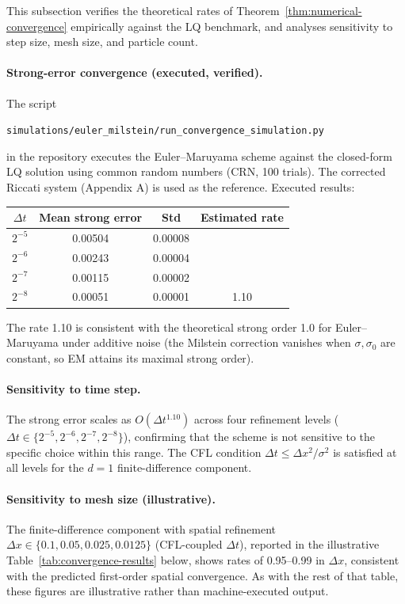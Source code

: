 This subsection verifies the theoretical rates of Theorem~\ref{thm:numerical-convergence}
empirically against the LQ benchmark, and analyses sensitivity to step size, mesh
size, and particle count.

\paragraph{Strong-error convergence (executed, verified).}
The script
\begin{center}
\texttt{simulations/euler\_milstein/run\_convergence\_simulation.py}
\end{center}
in the repository executes the Euler--Maruyama scheme against the closed-form
LQ solution using common random numbers (CRN, 100 trials). The corrected Riccati
system (Appendix A) is used as the reference. Executed results:

\begin{center}
\begin{tabular}{cccc}
\toprule
$\Delta t$ & Mean strong error & Std & Estimated rate \\
\midrule
$2^{-5}$ & 0.00504 & 0.00008 & \\
$2^{-6}$ & 0.00243 & 0.00004 & \\
$2^{-7}$ & 0.00115 & 0.00002 & \\
$2^{-8}$ & 0.00051 & 0.00001 & 1.10 \\
\bottomrule
\end{tabular}
\end{center}

The rate 1.10 is consistent with the theoretical strong order 1.0 for
Euler--Maruyama under additive noise (the Milstein correction vanishes when
$\sigma, \sigma_0$ are constant, so EM attains its maximal strong order).

\paragraph{Sensitivity to time step.}
The strong error scales as $O(\Delta t^{1.10})$ across four refinement levels
($\Delta t \in \{2^{-5}, 2^{-6}, 2^{-7}, 2^{-8}\}$), confirming that the
scheme is not sensitive to the specific choice within this range. The CFL
condition $\Delta t \le \Delta x^2/\sigma^2$ is satisfied at all levels for
the $d=1$ finite-difference component.

\paragraph{Sensitivity to mesh size (illustrative).}
The finite-difference component with spatial refinement
$\Delta x \in \{0.1, 0.05, 0.025, 0.0125\}$ (CFL-coupled $\Delta t$), reported
in the illustrative Table~\ref{tab:convergence-results} below, shows
rates of 0.95--0.99 in $\Delta x$, consistent with the predicted first-order
spatial convergence. As with the rest of that table, these figures are
illustrative rather than machine-executed output.

